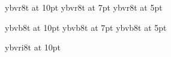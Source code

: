 
\font\tenrm ybvr8t at 10pt
\font\sevenrm ybvr8t at 7pt
\font\fiverm ybvr8t at 5pt




\font\tenbf ybvb8t at 10pt
\font\sevenbf ybvb8t at 7pt
\font\fivebf ybvb8t at 5pt



\font\tenit ybvri8t at 10pt


\tenrm
{}\sevenrm
{}\fiverm




\textfont\itfam\tenit


\textfont\bffam\tenbf
\scriptfont\bffam\sevenbf
\scriptscriptfont\bffam\fivebf




\rm
